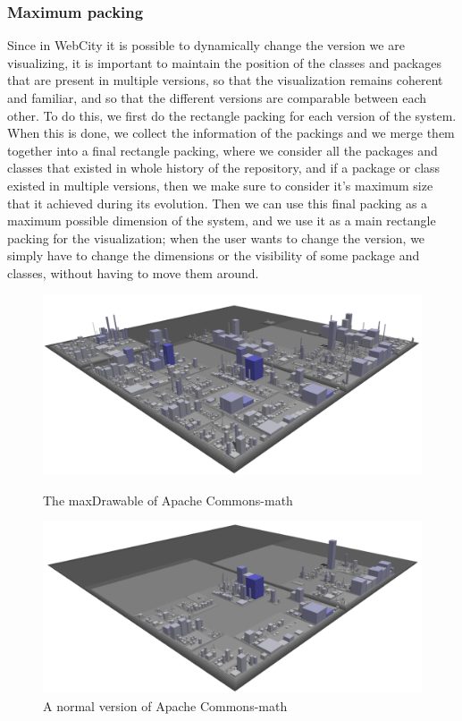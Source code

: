 \documentclass[]{usiinfbachelorproject}
\begin{document}
\subsubsection{Maximum packing} \label{Maximum packing}
Since in WebCity it is possible to dynamically change the version we are visualizing, it is important to maintain the position of the classes and packages that are present in multiple versions, so that the visualization remains coherent and familiar, and so that the different versions are comparable between each other.
To do this, we first do the rectangle packing for each version of the system. When this is done, we collect the information of the packings and we merge them together into a final rectangle packing, where we consider all the packages and classes that existed in whole history of the repository, and if a package or class existed in multiple versions, then we make sure to consider it's maximum size that it achieved during its evolution.
Then we can use this final packing as a maximum possible dimension of the system, and we use it as a main rectangle packing for the visualization; when the user wants to change the version, we simply have to change the dimensions or the visibility of some package and classes, without having to move them around.


\begin{figure}[H]
  \centering
  \begin{minipage}[b]{0.49\textwidth}
      \includegraphics[width=1\textwidth]{pictures/maxDrawable1.png}
      \caption{The maxDrawable of Apache Commons-math}
      \label{fig:interface}
  \end{minipage}
  \hfill
  \begin{minipage}[b]{0.49\textwidth}
      \includegraphics[width=1\textwidth]{pictures/maxDrawable2.png}
      \caption{A normal version of Apache Commons-math}
      \label{fig:interface2}
  \end{minipage}
\end{figure}
\end{document}
